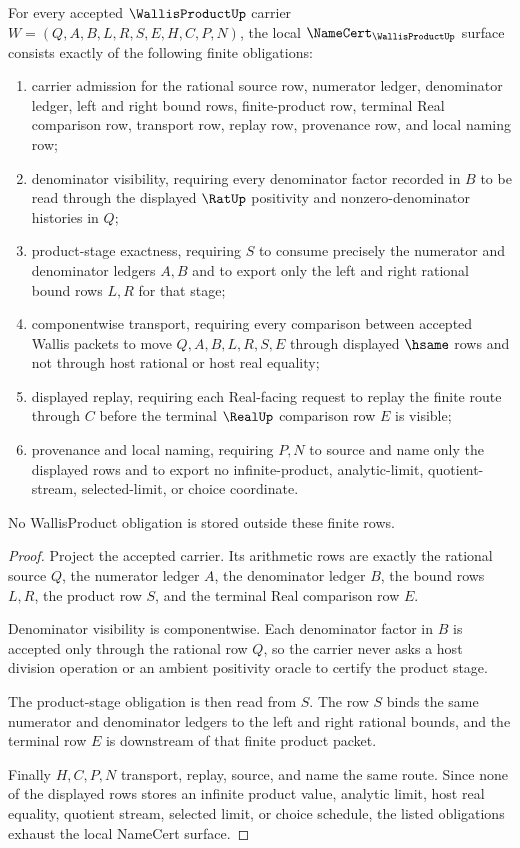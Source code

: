 \begin{theorem}
\label{thm:wallis-product-namecert-obligations}
For every accepted $\WallisProductUp$ carrier $W=(Q,A,B,L,R,S,E,H,C,P,N)$, the local $\NameCert_{\WallisProductUp}$ surface consists exactly of the following finite obligations:
\begin{enumerate}
\item carrier admission for the rational source row, numerator ledger, denominator ledger, left and right bound rows, finite-product row, terminal Real comparison row, transport row, replay row, provenance row, and local naming row;
\item denominator visibility, requiring every denominator factor recorded in $B$ to be read through the displayed $\RatUp$ positivity and nonzero-denominator histories in $Q$;
\item product-stage exactness, requiring $S$ to consume precisely the numerator and denominator ledgers $A,B$ and to export only the left and right rational bound rows $L,R$ for that stage;
\item componentwise transport, requiring every comparison between accepted Wallis packets to move $Q,A,B,L,R,S,E$ through displayed $\hsame$ rows and not through host rational or host real equality;
\item displayed replay, requiring each Real-facing request to replay the finite route through $C$ before the terminal $\RealUp$ comparison row $E$ is visible;
\item provenance and local naming, requiring $P,N$ to source and name only the displayed rows and to export no infinite-product, analytic-limit, quotient-stream, selected-limit, or choice coordinate.
\end{enumerate}
No WallisProduct obligation is stored outside these finite rows.
\end{theorem}
\begin{proof}
Project the accepted carrier. Its arithmetic rows are exactly the rational source $Q$, the numerator ledger $A$, the denominator ledger $B$, the bound rows $L,R$, the product row $S$, and the terminal Real comparison row $E$.

Denominator visibility is componentwise. Each denominator factor in $B$ is accepted only through the rational row $Q$, so the carrier never asks a host division operation or an ambient positivity oracle to certify the product stage.

The product-stage obligation is then read from $S$. The row $S$ binds the same numerator and denominator ledgers to the left and right rational bounds, and the terminal row $E$ is downstream of that finite product packet.

Finally $H,C,P,N$ transport, replay, source, and name the same route. Since none of the displayed rows stores an infinite product value, analytic limit, host real equality, quotient stream, selected limit, or choice schedule, the listed obligations exhaust the local NameCert surface.
\end{proof}

